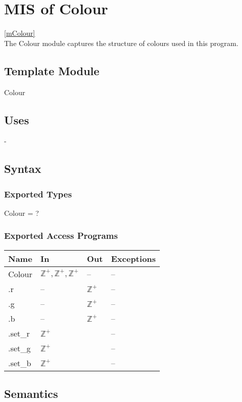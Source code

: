 \documentclass[12pt, titlepage]{article}
\begin{document}
\newpage

\section{MIS of Colour} \ref{mColour} \\
The Colour module captures the structure of colours used in this program.

\subsection{Template Module}
Colour

\subsection{Uses} -

\subsection{Syntax}
\subsubsection{Exported Types}
Colour = ?

\subsubsection{Exported Access Programs}
\begin{center}
	\begin{tabular}{p{4cm} p{2cm} p{2cm} p{4cm}}
		\hline
		\textbf{Name} & \textbf{In} & \textbf{Out} & \textbf{Exceptions} \\
		\hline
		Colour & $\mathbb{Z}^+,\mathbb{Z}^+,\mathbb{Z}^+$ & -- & 
		-- \\
		.r & -- & $\mathbb{Z}^+$ & -- \\
		.g & -- & $\mathbb{Z}^+$ & -- \\		
		.b & -- & $\mathbb{Z}^+$ & -- \\		%
		.set\_r & $\mathbb{Z}^+$ & & -- \\
		.set\_g & $\mathbb{Z}^+$ & & -- \\		
		.set\_b & $\mathbb{Z}^+$ & & -- \\		%
		\hline
	\end{tabular}
\end{center}

\subsection{Semantics}
\end{document}
